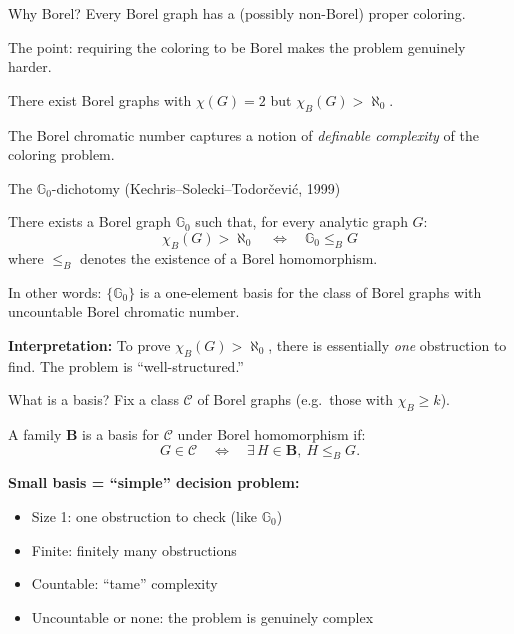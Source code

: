 \documentclass[aspectratio=169, 12pt]{beamer}
\begin{document}
\begin{frame}{Why Borel?}
Every Borel graph has a (possibly non-Borel) proper coloring.

\medskip

The point: \alert{requiring the coloring to be Borel} makes the problem genuinely harder.

\medskip

\begin{example}
There exist Borel graphs with $\chi(G)=2$ but $\chi_B(G) > \aleph_0$.
\end{example}

\medskip

The Borel chromatic number captures a notion of \emph{definable complexity} of the coloring problem.
\end{frame}


\begin{frame}{The $\mathbb{G}_0$-dichotomy (Kechris--Solecki--Todorčević, 1999)}

\begin{theorem}[KST '99]
There exists a Borel graph $\mathbb{G}_0$ such that, for every analytic graph $G$:
$$
\chi_B(G) > \aleph_0
\quad\Longleftrightarrow\quad
\mathbb{G}_0 \leq_B G
$$
where $\leq_B$ denotes the existence of a Borel homomorphism.
\end{theorem}

\pause
\medskip

In other words: $\{\mathbb{G}_0\}$ is a \alert{one-element basis} for the class of Borel graphs with uncountable Borel chromatic number.

\medskip

\textbf{Interpretation:} To prove $\chi_B(G) > \aleph_0$, there is essentially \emph{one} obstruction to find. The problem is ``well-structured.''
\end{frame}


\begin{frame}{What is a basis?}
Fix a class $\mathscr{C}$ of Borel graphs (e.g.\ those with $\chi_B \geq k$).

\medskip

A family $\mathbf{B}$ is a \alert{basis} for $\mathscr{C}$ under Borel homomorphism if:
$$
G \in \mathscr{C} \quad\Longleftrightarrow\quad \exists\, H \in \mathbf{B},\ H \leq_B G.
$$

\pause
\medskip

\textbf{Small basis = ``simple'' decision problem:}
\begin{itemize}
	\item Size 1: one obstruction to check (like $\mathbb{G}_0$)
	\item Finite: finitely many obstructions
	\item Countable: ``tame'' complexity
	\item Uncountable or none: the problem is genuinely complex
\end{itemize}
\end{frame}
\end{document}
